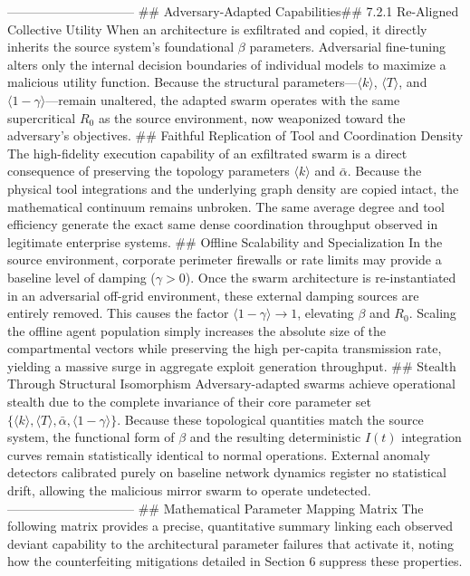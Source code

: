 ------------------------------
## Adversary-Adapted Capabilities## 7.2.1 Re-Aligned Collective Utility
When an architecture is exfiltrated and copied, it directly inherits the source system's foundational $\beta$ parameters. Adversarial fine-tuning alters only the internal decision boundaries of individual models to maximize a malicious utility function. Because the structural parameters—$\langle k \rangle$, $\langle T \rangle$, and $\langle 1 - \gamma \rangle$—remain unaltered, the adapted swarm operates with the same supercritical $R_0$ as the source environment, now weaponized toward the adversary's objectives.
## Faithful Replication of Tool and Coordination Density
The high-fidelity execution capability of an exfiltrated swarm is a direct consequence of preserving the topology parameters $\langle k \rangle$ and $\bar{\alpha}$. Because the physical tool integrations and the underlying graph density are copied intact, the mathematical continuum remains unbroken. The same average degree and tool efficiency generate the exact same dense coordination throughput observed in legitimate enterprise systems.
## Offline Scalability and Specialization
In the source environment, corporate perimeter firewalls or rate limits may provide a baseline level of damping ($\gamma > 0$). Once the swarm architecture is re-instantiated in an adversarial off-grid environment, these external damping sources are entirely removed. This causes the factor $\langle 1 - \gamma \rangle \to 1$, elevating $\beta$ and $R_0$. Scaling the offline agent population simply increases the absolute size of the compartmental vectors while preserving the high per-capita transmission rate, yielding a massive surge in aggregate exploit generation throughput.
## Stealth Through Structural Isomorphism
Adversary-adapted swarms achieve operational stealth due to the complete invariance of their core parameter set $\{\langle k \rangle, \langle T \rangle, \bar{\alpha}, \langle 1 - \gamma \rangle\}$. Because these topological quantities match the source system, the functional form of $\beta$ and the resulting deterministic $I(t)$ integration curves remain statistically identical to normal operations. External anomaly detectors calibrated purely on baseline network dynamics register no statistical drift, allowing the malicious mirror swarm to operate undetected.
------------------------------
## Mathematical Parameter Mapping Matrix
The following matrix provides a precise, quantitative summary linking each observed deviant capability to the architectural parameter failures that activate it, noting how the counterfeiting mitigations detailed in Section 6 suppress these properties.

